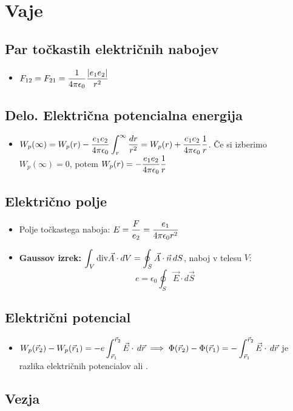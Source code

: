 \section{Vaje}
\subsection{Par točkastih električnih nabojev}
\begin{itemize}
    \item \(\displaystyle F_{12}=F_{21} = \frac{1}{4 \pi \epsilon_0} \frac{|e_1e_2|}{r^2}\)
\end{itemize}
\subsection{Delo. Električna potencialna energija}
\begin{itemize}
    \item \(\displaystyle W_p(\infty) = W_p(r) -  \frac{e_1 e_2}{4 \pi \epsilon_0} \int_{r}^{\infty} \frac{dr}{r^2} = W_p(r) + \frac{e_1e_2}{4\pi \epsilon_0} \frac{1}{r}\). Če si izberimo \(W_p(\infty) = 0\), potem \(\displaystyle W_p(r) = -  \frac{e_1e_2}{4\pi \epsilon_0} \frac{1}{r}\)
\end{itemize}
\subsection{Električno polje}
\begin{itemize}
    \item Polje točkastega naboja: \(\displaystyle E = \frac{F}{e_2} = \frac{e_1}{4 \pi \epsilon_0 r^2}\)
    \item \textbf{Gaussov izrek:} \(\displaystyle \int_{V} \text{div} \vec{A} \cdot dV = \oint_S \vec{A} \cdot \vec{n} \, dS\), naboj v telesu \(V\): \[e = \epsilon_0 \oint_S \vec{E} \cdot d \vec{S}\]
\end{itemize}
\subsection{Električni potencial}
\begin{itemize}
    \item \(\displaystyle W_p(\vec{r}_2)- W_p(\vec{r}_1) = -e \int_{\vec{r}_1}^{\vec{r}_2} \vec{E} \cdot \, d \vec{r} \implies \Phi(\vec{r}_2) - \Phi(\vec{r}_1) = - \int_{\vec{r}_1}^{\vec{r}_2} \vec{E} \cdot \, d \vec{r} \) je razlika električnih potencialov ali .
\end{itemize}

\subsection{Vezja}
